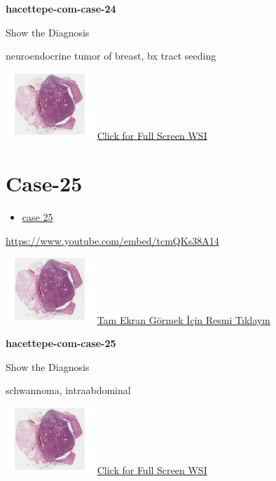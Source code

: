 \documentclass[
  letterpaper,
  paper=6in:9in,
  pagesize=pdftex,
  headinclude=on,
  footinclude=on,
  12pt]{scrbook}
\providecommand{\tightlist}{%
  \setlength{\itemsep}{0pt}\setlength{\parskip}{0pt}}\usepackage{longtable,booktabs,array}
\begin{document}
\textbf{hacettepe-com-case-24}

Show the Diagnosis

\hypertarget{answer24}{}
neuroendocrine tumor of breast, bx tract seeding

\href{https://images.patolojiatlasi.com/hacettepe-com-case-1/HE.html}{\includegraphics[width=0.25\textwidth,height=\textheight]{./screenshots/hacettepe-com-case-1_screenshot.png}}
\href{https://images.patolojiatlasi.com/hacettepe-com-case-24/HE.html}{Click
for Full Screen WSI}

\hypertarget{sec-hacettepe-case-of-the-month-case-25}{%
\section{Case-25}\label{sec-hacettepe-case-of-the-month-case-25}}

\begin{itemize}
\tightlist
\item
  \href{https://www.youtube.com/watch?v=tcmQKs38A14\&ab_channel=KemalKosemehmetoglu}{case
  25}
\end{itemize}

\url{https://www.youtube.com/embed/tcmQKs38A14}

\href{https://images.patolojiatlasi.com/hacettepe-com-case-1/HE.html}{\includegraphics[width=0.25\textwidth,height=\textheight]{./screenshots/hacettepe-com-case-1_screenshot.png}}
\href{https://images.patolojiatlasi.com/hacettepe-com-case-25/HE.html}{Tam
Ekran Görmek İçin Resmi Tıklayın}

\textbf{hacettepe-com-case-25}

Show the Diagnosis

\hypertarget{answer25}{}
schwannoma, intraabdominal

\href{https://images.patolojiatlasi.com/hacettepe-com-case-1/HE.html}{\includegraphics[width=0.25\textwidth,height=\textheight]{./screenshots/hacettepe-com-case-1_screenshot.png}}
\href{https://images.patolojiatlasi.com/hacettepe-com-case-25/HE.html}{Click
for Full Screen WSI}
\end{document}

